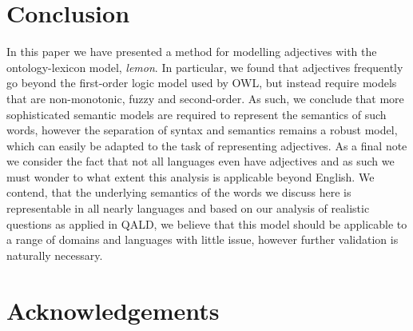 \documentclass[11pt]{article}
\begin{document}
\section{Conclusion}

In this paper we have presented a method for modelling adjectives with the
ontology-lexicon model, \emph{lemon}. In particular, we found that adjectives
frequently go beyond the first-order logic model used by OWL, but instead 
require models that are non-monotonic, fuzzy and second-order. As such, we 
conclude that more sophisticated semantic models are required to represent the semantics
of such words, however the separation of syntax and semantics remains a robust
model, which can easily be adapted to the task of representing adjectives. As 
a final note we consider the fact that not all languages even have adjectives
\cite{?} and as such we must wonder to what extent this analysis is applicable
beyond English. We contend, that the underlying semantics of the words we discuss here
is representable in all nearly languages and based on our analysis of realistic
questions as applied in QALD, we believe that this model should be applicable
to a range of domains and languages with little issue, however further 
validation is naturally necessary.

\section*{Acknowledgements}



\end{document}
